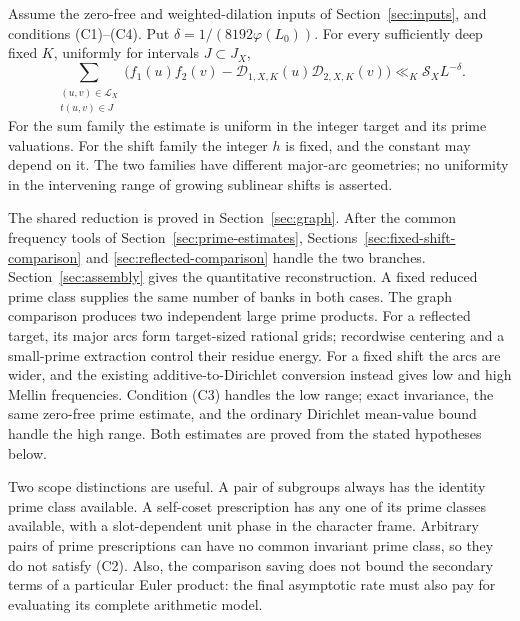 \begin{theorem}\label{thm:model-comparison}
Assume the zero-free and weighted-dilation inputs of
Section~\ref{sec:inputs}, and conditions \textup{(C1)--(C4)}.
Put \(\delta=1/(8192\varphi(L_0))\). For every sufficiently deep
fixed \(K\), uniformly for intervals \(J\subset J_X\),
\begin{equation}\label{eq:model-comparison-conclusion}
 \sum_{\substack{(u,v)\in\mathcal L_X\\t(u,v)\in J}}
     \bigl(f_1(u)f_2(v)-\mathcal D_{1,X,K}(u)\mathcal D_{2,X,K}(v)\bigr)
                       \ll_K\mathcal S_XL^{-\delta}.
\end{equation}
For the sum family the estimate is uniform in the integer target
and its prime valuations. For the shift family the integer \(h\)
is fixed, and the constant may depend on it. The two families have
different major-arc geometries; no uniformity in the intervening
range of growing sublinear shifts is asserted.
\end{theorem}

The shared reduction is proved in Section~\ref{sec:graph}.
After the common frequency tools of Section~\ref{sec:prime-estimates},
Sections~\ref{sec:fixed-shift-comparison} and
\ref{sec:reflected-comparison} handle the two branches.
Section~\ref{sec:assembly} gives the quantitative reconstruction. A fixed reduced prime
class supplies the same number of banks in both cases. The graph
comparison produces two independent large prime products. For a
reflected target, its major arcs form target-sized rational grids;
recordwise centering and a small-prime extraction control their
residue energy. For a fixed shift the arcs are wider, and the existing
additive-to-Dirichlet conversion instead gives low and high Mellin
frequencies. Condition (C3) handles the low range; exact invariance,
the same zero-free prime estimate, and the ordinary Dirichlet
mean-value bound handle the high range. Both estimates are proved
from the stated hypotheses below.

Two scope distinctions are useful. A pair of subgroups always has
the identity prime class available. A self-coset prescription has
any one of its prime classes available, with a slot-dependent unit
phase in the character frame. Arbitrary pairs of prime prescriptions
can have no common invariant prime class, so they do not satisfy
(C2). Also, the comparison saving does not bound the secondary
terms of a particular Euler product: the final asymptotic rate must
also pay for evaluating its complete arithmetic model.

